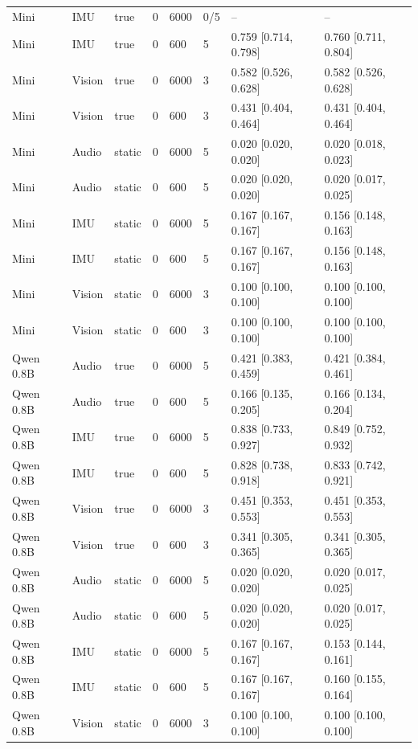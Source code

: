 {\begin{longtable}{@{}llllllll@{}}
Mini & IMU & true & 0 & 6000 & 0/5 & -- & -- \\
Mini & IMU & true & 0 & 600 & 5 & 0.759 [0.714, 0.798] & 0.760 [0.711, 0.804] \\
Mini & Vision & true & 0 & 6000 & 3 & 0.582 [0.526, 0.628] & 0.582 [0.526, 0.628] \\
Mini & Vision & true & 0 & 600 & 3 & 0.431 [0.404, 0.464] & 0.431 [0.404, 0.464] \\
Mini & Audio & static & 0 & 6000 & 5 & 0.020 [0.020, 0.020] & 0.020 [0.018, 0.023] \\
Mini & Audio & static & 0 & 600 & 5 & 0.020 [0.020, 0.020] & 0.020 [0.017, 0.025] \\
Mini & IMU & static & 0 & 6000 & 5 & 0.167 [0.167, 0.167] & 0.156 [0.148, 0.163] \\
Mini & IMU & static & 0 & 600 & 5 & 0.167 [0.167, 0.167] & 0.156 [0.148, 0.163] \\
Mini & Vision & static & 0 & 6000 & 3 & 0.100 [0.100, 0.100] & 0.100 [0.100, 0.100] \\
Mini & Vision & static & 0 & 600 & 3 & 0.100 [0.100, 0.100] & 0.100 [0.100, 0.100] \\
Qwen 0.8B & Audio & true & 0 & 6000 & 5 & 0.421 [0.383, 0.459] & 0.421 [0.384, 0.461] \\
Qwen 0.8B & Audio & true & 0 & 600 & 5 & 0.166 [0.135, 0.205] & 0.166 [0.134, 0.204] \\
Qwen 0.8B & IMU & true & 0 & 6000 & 5 & 0.838 [0.733, 0.927] & 0.849 [0.752, 0.932] \\
Qwen 0.8B & IMU & true & 0 & 600 & 5 & 0.828 [0.738, 0.918] & 0.833 [0.742, 0.921] \\
Qwen 0.8B & Vision & true & 0 & 6000 & 3 & 0.451 [0.353, 0.553] & 0.451 [0.353, 0.553] \\
Qwen 0.8B & Vision & true & 0 & 600 & 3 & 0.341 [0.305, 0.365] & 0.341 [0.305, 0.365] \\
Qwen 0.8B & Audio & static & 0 & 6000 & 5 & 0.020 [0.020, 0.020] & 0.020 [0.017, 0.025] \\
Qwen 0.8B & Audio & static & 0 & 600 & 5 & 0.020 [0.020, 0.020] & 0.020 [0.017, 0.025] \\
Qwen 0.8B & IMU & static & 0 & 6000 & 5 & 0.167 [0.167, 0.167] & 0.153 [0.144, 0.161] \\
Qwen 0.8B & IMU & static & 0 & 600 & 5 & 0.167 [0.167, 0.167] & 0.160 [0.155, 0.164] \\
Qwen 0.8B & Vision & static & 0 & 6000 & 3 & 0.100 [0.100, 0.100] & 0.100 [0.100, 0.100] \\

\end{longtable}}
